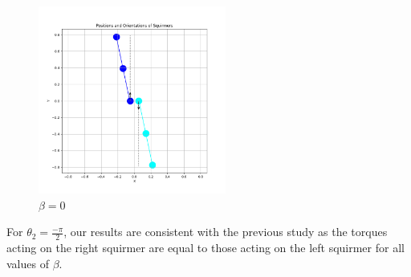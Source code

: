 \documentclass{article}
\begin{document}
\begin{figure}[H]
\begin{minipage}{0.49\textwidth}
        \caption{\footnotesize $\beta = 3$}
    \end{minipage}
    \includegraphics[width=0.55\textwidth]{graphs/simulations/sim_sq_sq/beta0/mpi_2_.png}
    \caption{\footnotesize $\beta = 0$}
\end{figure}
For $\theta_2 = \frac{-\pi}{2}$, our results are consistent with the previous study\cite{Stark} as the torques acting on the right squirmer are equal to
those acting on the left squirmer for all values of $\beta$.
\end{document}
